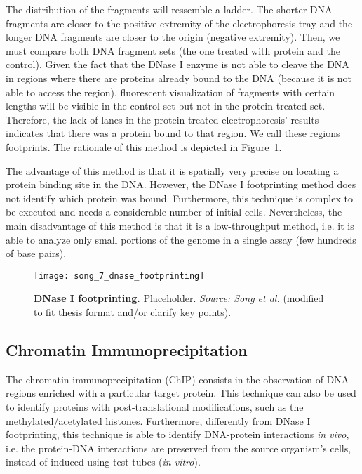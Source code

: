 The distribution of the fragments will ressemble a ladder. The shorter DNA fragments are closer to the positive extremity of the electrophoresis tray and the longer DNA fragments are closer to the origin (negative extremity). Then, we must compare both DNA fragment sets (the one treated with protein and the control). Given the fact that the DNase I enzyme is not able to cleave the DNA in regions where there are proteins already bound to the DNA (because it is not able to access the region), fluorescent visualization of fragments with certain lengths will be visible in the control set but not in the protein-treated set. Therefore, the lack of lanes in the protein-treated electrophoresis' results indicates that there was a protein bound to that region. We call these regions footprints. The rationale of this method is depicted in Figure~\ref{fig:song_dnase_footprinting}.

The advantage of this method is that it is spatially very precise on locating a protein binding site in the DNA. However, the DNase I footprinting method does not identify which protein was bound. Furthermore, this technique is complex to be executed and needs a considerable number of initial cells. Nevertheless, the main disadvantage of this method is that it is a low-throughput method, i.e. it is able to analyze only small portions of the genome in a single assay (few hundreds of base pairs).

\begin{figure}[h!]
\centering
\texttt{[image: song\_7\_dnase\_footprinting]}
\caption[DNase I footprinting]{\textbf{DNase I footprinting.} Placeholder. \emph{Source: Song et al.}\cite{song2015} (modified to fit thesis format and/or clarify key points).}
\label{fig:song_dnase_footprinting}
\end{figure}

\subsection{Chromatin Immunoprecipitation}
\label{sec:chromatin.immunoprecipitation}

The chromatin immunoprecipitation (ChIP) consists in the observation of DNA regions enriched with a particular target protein. This technique can also be used to identify proteins with post-translational modifications, such as the methylated/acetylated histones. Furthermore, differently from DNase I footprinting, this technique is able to identify DNA-protein interactions \emph{in vivo}, i.e. the protein-DNA interactions are preserved from the source organism's cells, instead of induced using test tubes (\emph{in vitro}).

